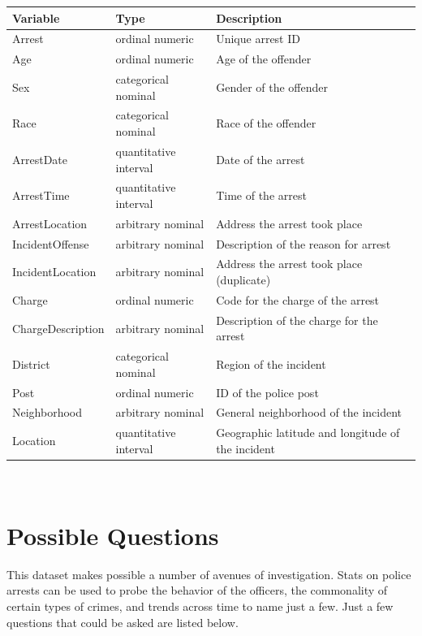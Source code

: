 \documentclass[a4paper,11pt]{article}
\begin{document}
\begin{center}
\begin{tabular}{| l | l | l | }
  \hline	
      Variable & Type & Description  \\  \hline \hline
      Arrest & ordinal numeric & Unique arrest ID \\ \hline
      Age & ordinal numeric & Age of the offender \\ \hline
      Sex & categorical nominal & Gender of the offender \\ \hline
      Race & categorical nominal & Race of the offender \\ \hline
      ArrestDate & quantitative interval & Date of the arrest \\ \hline
      ArrestTime & quantitative interval & Time of the arrest \\ \hline
      ArrestLocation & arbitrary nominal & Address the arrest took place \\ \hline
      IncidentOffense & arbitrary nominal & Description of the reason for arrest \\ \hline
      IncidentLocation & arbitrary nominal & Address the arrest took place (duplicate)\\ \hline
      Charge & ordinal numeric & Code for the charge of the arrest\\ \hline
      ChargeDescription & arbitrary nominal & Description of the charge for the arrest \\ \hline
      District & categorical nominal & Region of the incident\\ \hline
      Post & ordinal numeric & ID of the police post\\ \hline
      Neighborhood & arbitrary nominal & General neighborhood of the incident \\ \hline
      Location & quantitative interval & Geographic latitude and longitude of the incident \\ \hline
\end{tabular} \\
\end{center}

\section{Possible Questions}
This dataset makes possible a number of avenues of investigation.  Stats on police arrests can be used to probe the behavior of the officers, the commonality of certain types of crimes, and trends across time to name just a few.  Just a few questions that could be asked are listed below. 
\end{document}
